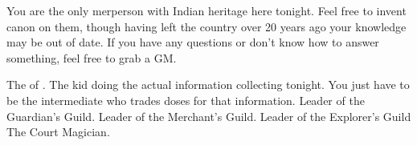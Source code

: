\documentclass[char]{NeptuneBall}
\begin{document}
\begin{itemz}[Notes]
  \item You are the only merperson with Indian heritage here tonight. Feel free to invent canon on them, though having left the country over 20 years ago your knowledge may be out of date. If you have any questions or don't know how to answer something, feel free to grab a GM.
\end{itemz}


\begin{contacts}
  \contact{\cKing{}} The \cKing{\King} of \pAtlantis{}.
	\contact{\cWillow{}} The kid doing the actual information collecting tonight. You just have to be the intermediate who trades \iDrug{} doses for that information.
  \contact{\cGeneral{}} Leader of the Guardian's Guild.
  \contact{\cSlave{}} Leader of the Merchant's Guild.
  \contact{\cPriest{}} Leader of the Explorer's Guild
  \contact{\cManta{}} The Court Magician.
\end{contacts}
\end{document}
